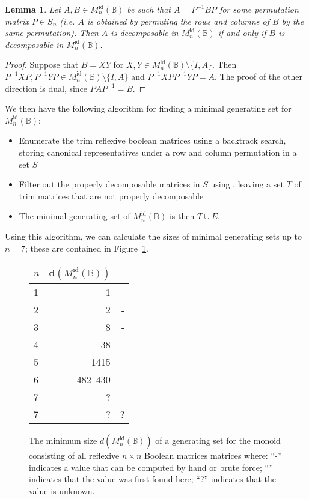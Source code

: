 \documentclass[11pt]{article}
\newtheorem{lemma}[thm]{Lemma}
\numberwithin{equation}{section}
\newcommand{\B}{\mathbb{B}}
\newcommand{\Refn}{M_n^{\text{id}}(\B)}
\newcommand{\cmark}{\ding{51}}
\begin{document}
\begin{lemma}
  Let $A, B \in \Refn$ be such that $A = P^{-1} B P$ for some permutation matrix
  $P \in S_n$ (i.e. $A$ is obtained by permuting the rows and columns of $B$ by
  the same permutation). Then $A$ is decomposable in $\Refn$ if and only if $B$
  is decomposable in $\Refn$.
\end{lemma}
\begin{proof}
  Suppose that $B = XY$ for $X, Y \in \Refn\setminus \{I, A\}$. Then $P^{-1}XP,
  P^{-1}YP \in \Refn\setminus\{I, A\}$ and $P^{-1}XPP^{-1}YP = A$. The proof of
  the other direction is dual, since $PAP^{-1} = B$.
\end{proof}

We then have the following algorithm for finding a minimal generating set for
$\Refn$:
\begin{itemize}
  \item
    Enumerate the trim reflexive boolean matrices using a backtrack search,
    storing canonical representatives under a row and column permutation in a
    set $S$
  \item 
    Filter out the properly decomposable matrices in $S$ using
    , leaving a set $T$ of trim matrices that
    are not properly decomposable
  \item
    The minimal generating set of $\Refn$ is then $T \cup E$.
\end{itemize}
Using this algorithm, we can calculate the sizes of minimal generating sets up
to $n = 7$; these are contained in Figure~\ref{fig:reflexiverank}.

\begin{figure}
  \centering
  \begin{tabular}{l|r|r}
    $n$ & $\mathbf{d}(\Refn)$ &   \\
    \hline
    1 & 1          & - \\ 
    2 & 2          & - \\ 
    3 & 8          & - \\ 
    4 & 38         & - \\
    5 & 1415       & \cmark \\
    6 & 482\ 430   & \cmark \\ 
    7 & ?          & \cmark \\
    7 & ?          & ? \\
  \end{tabular}
  \caption{The minimum size $d(\Refn)$ of a generating set for the monoid
    consisting of all reflexive $n \times n$ Boolean matrices matrices where:
    ``-'' indicates a value that can be computed by hand or brute force;
    ``\cmark'' indicates that the value was first found here; ``?'' indicates
    that the value is unknown.}
  \label{fig:reflexiverank}
\end{figure}

\printbibliography
\end{document}
